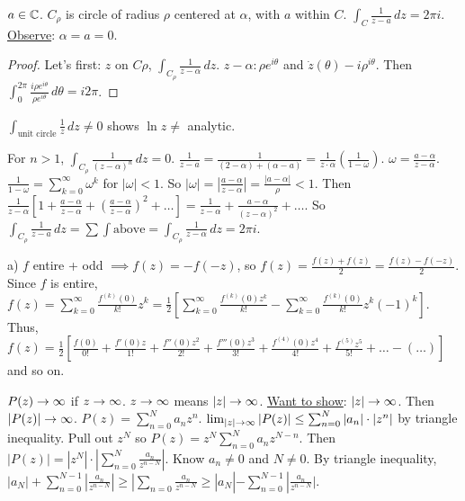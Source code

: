 \documentclass[]{article}
\begin{document}
\begin{lemma}
	$a\in\mathbb{C}$. $C_\rho$ is circle of radius $\rho$ centered at $\alpha$, with $a$ within $C$. $\int_C \frac{1}{z-a} \, dz = 2\pi i$. \underline{Observe}: $\alpha=a=0$.
\end{lemma}
\begin{proof}
	Let's first: $z$ on $C\rho$, $\int_{C_\rho} \frac{1}{z-\alpha} \, dz$. $z-\alpha: \rho e^{i\theta}$ and $\dot{z}(\theta) - i\rho^{i\theta}$. Then $\int_0^{2\pi} \frac{i\rho e^{i\theta}}{\rho e^{i\theta}} \, d\theta = i2\pi$.
\end{proof}

\begin{fact}
	$\int_{\text{unit circle}} \frac{1}{z} \, dz \neq 0$ shows $\ln z \neq $ analytic.
\end{fact}
\begin{recall}
	For $n>1$, $\int_{C_\rho} \frac{1}{(z-\alpha)^n} \, dz = 0$. $\frac{1}{z-a} = \frac{1}{(2-\alpha) + (\alpha -a)} = \frac{1}{z\cdot\alpha} \left( \frac{1}{1-\omega} \right)$. $\omega = \frac{a-\alpha}{z-\alpha}$. $\frac{1}{1-\omega} = \sum_{k=0}^\infty \omega^k$ for $|\omega|<1$. So $|\omega| = \left| \frac{a-\alpha}{z-\alpha} \right| = \frac{|a-\alpha|}{\rho} < 1$. Then $\frac{1}{z-\alpha} \left[ 1+ \frac{a-\alpha}{z-\alpha} + \left( \frac{a-\alpha}{z-\alpha} \right)^2 + \dots \right] = \frac{1}{z-\alpha} + \frac{a-\alpha}{(z-\alpha)^2} + \dots$. So $\int_{C_\rho} \frac{1}{z-a} \, dz = \sum \int \text{above} = \int_{C_\rho} \frac{1}{z-\alpha} \, dz = 2\pi i$.
\end{recall}
\begin{example}
	[Ashley, HW Ch5, \#3] a) $f$ entire + odd $\implies f(z)=-f(-z)$, so $f(z) = \frac{f(z)+f(z)}{2} = \frac{f(z)-f(-z)}{2}$. Since $f$ is entire, $f(z) = \sum_{k=0}^\infty \frac{f^{(k)} (0)}{k!}z^k = \frac{1}{2} \left[ \sum_{k=0}^\infty \frac{f^{(k)}(0)z^k}{k!} - \sum_{k=0}^\infty \frac{f^{(k)}(0)}{k!}z^k(-1)^k \right]$. Thus, $f(z) = \frac{1}{2} \left[ \frac{f(0)}{0!} + \frac{f'(0)z}{1!} + \frac{f''(0)z^2}{2!} + \frac{f'''(0)z^3}{3!} + \frac{f^{(4)}(0)z^4}{4!} + \frac{f^{(5)}z^5}{5!} + \dots - \left( \dots \right) \right]$ and so on.
\end{example}



\begin{example}
	[HW2, \#26] $P(z) \rightarrow \infty$ if $z\rightarrow \infty$. $z\rightarrow\infty$ means $|z|\rightarrow\infty$. \underline{Want to show}: $|z|\rightarrow\infty$. Then $|P(z)|\rightarrow\infty$. $P(z) = \sum_{n=0}^N a_n z^n$. $\lim_{|z|\rightarrow\infty} |P(z)| \leq \sum_{n=0}^N |a_n|\cdot |z^n|$ by triangle inequality. Pull out $z^N$ so $P(z) = z^N \sum_{n=0}^N a_n z^{N-n}$. Then $|P(z)| = |z^N| \cdot |\sum_{n=0}^N \frac{a_n}{z^{n-N}}|$. Know $a_n\neq 0$ and $N\neq0$. By triangle inequality, $|a_N| + \sum_{n=0}^{N-1} | \frac{a_n}{z^{n-N}}|\geq |\sum_{n=0} \frac{a_n}{z^{n-N}} \geq |a_N| - \sum_{n=0}^{N-1} | \frac{a_n}{z^{n-N}}|$.
\end{example}
\end{document}
